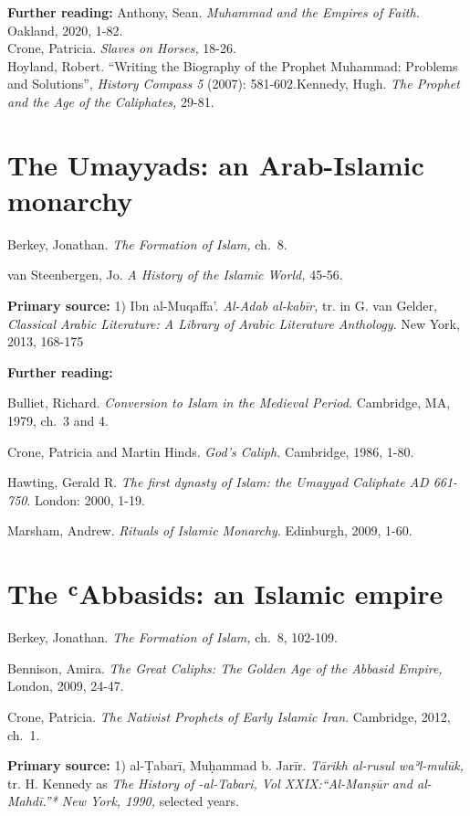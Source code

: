 \documentclass[
]{book}
\begin{document}
\textbf{Further reading:}
Anthony, Sean. \emph{Muhammad and the Empires of Faith.} Oakland, 2020, 1-82.\\
Crone, Patricia. \emph{Slaves on Horses,} 18-26.\\
Hoyland, Robert. ``Writing the Biography of the Prophet Muhammad: Problems and Solutions'', \emph{History Compass 5} (2007): 581-602.Kennedy, Hugh. \emph{The Prophet and the Age of the Caliphates,} 29-81.

\hypertarget{the-umayyads-an-arab-islamic-monarchy}{%
\chapter{The Umayyads: an Arab-Islamic monarchy}\label{the-umayyads-an-arab-islamic-monarchy}}

Berkey, Jonathan. \emph{The Formation of Islam,} ch.~8.

van Steenbergen, Jo. \emph{A History of the Islamic World,} 45-56.

\textbf{Primary source:} 1) Ibn al-Muqaffa'. \emph{Al-Adab al-kabīr,} tr. in G.
van Gelder, \emph{Classical Arabic Literature: A Library of Arabic Literature
Anthology}. New York, 2013, 168-175

\textbf{Further reading:}

Bulliet, Richard. \emph{Conversion to Islam in the Medieval Period.}
Cambridge, MA, 1979, ch.~3 and 4.

Crone, Patricia and Martin Hinds. \emph{God's Caliph.} Cambridge, 1986, 1-80.

Hawting, Gerald R. \emph{The first dynasty of Islam: the Umayyad Caliphate AD 661-750}. London: 2000, 1-19.

Marsham, Andrew. \emph{Rituals of Islamic Monarchy}. Edinburgh, 2009, 1-60.

\hypertarget{the-ux2bfabbasids-an-islamic-empire}{%
\chapter{The ʿAbbasids: an Islamic empire}\label{the-ux2bfabbasids-an-islamic-empire}}

Berkey, Jonathan. \emph{The Formation of Islam,} ch.~8, 102-109.

Bennison, Amira. \emph{The Great Caliphs: The Golden Age of the Abbasid Empire,} London, 2009, 24-47.

Crone, Patricia. \emph{The Nativist Prophets of Early Islamic Iran}. Cambridge, 2012, ch.~1.

\textbf{Primary source:} 1) al-Ṭabarī, Muḥammad b. Jarīr. \emph{Tārikh al-rusul waʾl-mulūk,} tr. H. Kennedy as \emph{The History of -al-Tabari, Vol XXIX:``Al-Manṣūr and al-Mahdī.''* New York, 1990,} selected years.
\end{document}
